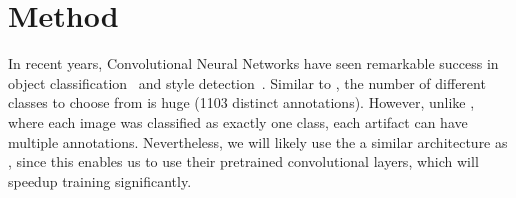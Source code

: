 \section{Method}
In recent years, Convolutional Neural Networks have seen remarkable success in object classification~\cite{alexnet} and style detection~\cite{style}.
Similar to \citet{alexnet}, the number of different classes to choose from is huge (1103 distinct annotations).
However, unlike \citeauthor{alexnet}, where each image was classified as exactly one class, each artifact can have multiple annotations.
Nevertheless, we will likely use the a similar architecture as \citeauthor{alexnet}, since this enables us to use their pretrained convolutional layers, which will speedup training significantly.